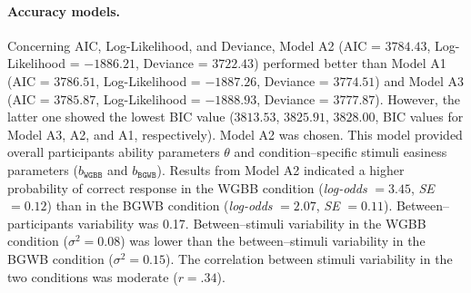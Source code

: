 \documentclass[12pt]{book}
\begin{document}
\paragraph{Accuracy models.} Concerning AIC, Log-Likelihood, and Deviance, Model A2 (AIC = $3784.43$, Log-Likelihood = $-1886.21$, Deviance = $3722.43$) performed better than Model A1 (AIC = $3786.51$, Log-Likelihood  = $-1887.26$, Deviance  = $3774.51$) and Model A3 (AIC = $3785.87$, Log-Likelihood  = $-1888.93$, Deviance  = $3777.87$). However, the latter one showed the lowest BIC value ($3813.53$, $3825.91$, $3828.00$, BIC values for Model A3, A2, and A1, respectively). Model A2 was chosen. This model provided overall participants ability parameters $\theta$ and condition--specific stimuli easiness parameters ($b_{\texttt{WGBB}}$ and $b_{\texttt{BGWB}}$).
Results from Model A2 indicated a higher probability of correct response in the WGBB condition (\emph{log-odds} $= 3.45$, \emph{SE} $= 0.12$) than in the BGWB condition (\emph{log-odds} $= 2.07$, \emph{SE} $= 0.11$). Between--participants variability was 0.17. Between--stimuli variability in the WGBB condition ($\sigma^2 = 0.08$) was lower than the between--stimuli variability in the BGWB condition ($\sigma^2 = 0.15$). The correlation between stimuli variability in the two conditions was moderate ($r = .34$). 
\end{document}
